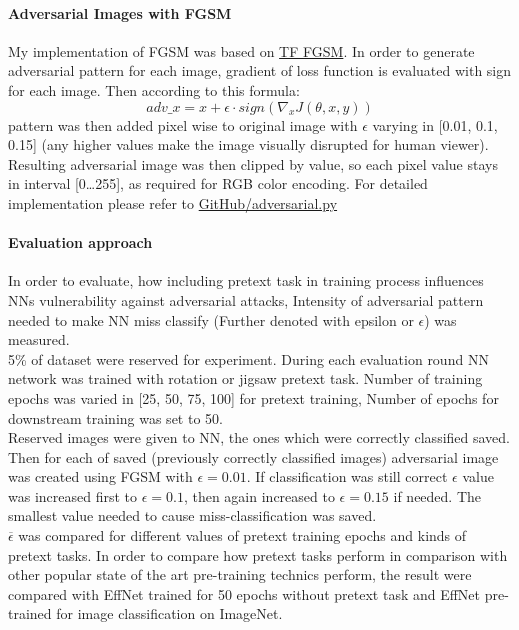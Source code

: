 \paragraph{Adversarial Images with FGSM}
My implementation of FGSM was based on \href{https://www.tensorflow.org/tutorials/generative/adversarial_fgsm}{TF FGSM}.
In order to generate adversarial pattern for each image, gradient of loss function is evaluated with sign for each image.
Then according to this formula:
\begin{equation}
    adv\_x = x + \epsilon \cdot sign(\nabla_x J(\theta, x, y))
\end{equation}
pattern was then added pixel wise to original image with $\epsilon$ varying in [0.01, 0.1, 0.15]
(any higher values make the image visually disrupted for human viewer).
Resulting adversarial image was then clipped by value, so each pixel value stays in interval [0\ldots255],
as required for RGB color encoding.
For detailed implementation please refer to \href{https://github.com/Goofy-Goof/ISS/blob/33a2ad40b779ff230aae31c29d2edc2cf5d90406/impl/util/adversarial.py}{GitHub/adversarial.py}


\paragraph{Evaluation approach}
In order to evaluate, how including pretext task in training process influences NNs vulnerability against adversarial attacks,
Intensity of adversarial pattern needed to make NN miss classify (Further denoted with epsilon or $\epsilon$) was measured.
\\
5\% of dataset were reserved for experiment.
During each evaluation round NN network was trained with rotation or jigsaw pretext task.
Number of training epochs was varied in [25, 50, 75, 100] for pretext training, Number of epochs for downstream training was set to 50.
\\
Reserved images were given to NN, the ones which were correctly classified saved.
Then for each of saved (previously correctly classified images) adversarial image was created using FGSM with $\epsilon = 0.01$.
If classification was still correct $\epsilon$ value was increased first to $\epsilon = 0.1$, then again increased to $\epsilon = 0.15$ if needed.
The smallest value needed to cause miss-classification was saved.
\\
$\overline{\epsilon}$ was compared for different values of pretext training epochs and kinds of pretext tasks.
In order to compare how pretext tasks perform in comparison with other popular state of the art pre-training technics perform,
the result were compared with EffNet trained for 50 epochs without pretext task and EffNet pre-trained for image classification on ImageNet.